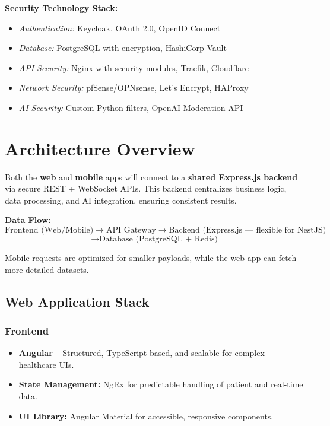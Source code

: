 \documentclass[a4paper, 12pt]{article}
\begin{document}
\textbf{Security Technology Stack:}
\begin{itemize}
    \item \textit{Authentication:} Keycloak, OAuth 2.0, OpenID Connect
    \item \textit{Database:} PostgreSQL with encryption, HashiCorp Vault
    \item \textit{API Security:} Nginx with security modules, Traefik, Cloudflare
    \item \textit{Network Security:} pfSense/OPNsense, Let's Encrypt, HAProxy
    \item \textit{AI Security:} Custom Python filters, OpenAI Moderation API
\end{itemize}




\section{Architecture Overview}
Both the \textbf{web} and \textbf{mobile} apps will connect to a \textbf{shared Express.js backend} via secure REST + WebSocket APIs. This backend centralizes business logic, data processing, and AI integration, ensuring consistent results.  

\noindent\textbf{Data Flow:}  
\[
\text{Frontend (Web/Mobile)} \rightarrow \text{API Gateway} \rightarrow \text{Backend (Express.js — flexible for NestJS)} \] 
\[
\rightarrow   \text{Database (PostgreSQL + Redis)}
\]


Mobile requests are optimized for smaller payloads, while the web app can fetch more detailed datasets.

\subsection{Web Application Stack}
\subsubsection*{Frontend}
\begin{itemize}
    \item \textbf{Angular} – Structured, TypeScript-based, and scalable for complex healthcare UIs.
    \item \textbf{State Management:} NgRx for predictable handling of patient and real-time data.
    \item \textbf{UI Library:} Angular Material for accessible, responsive components.
\end{itemize}
\end{document}
